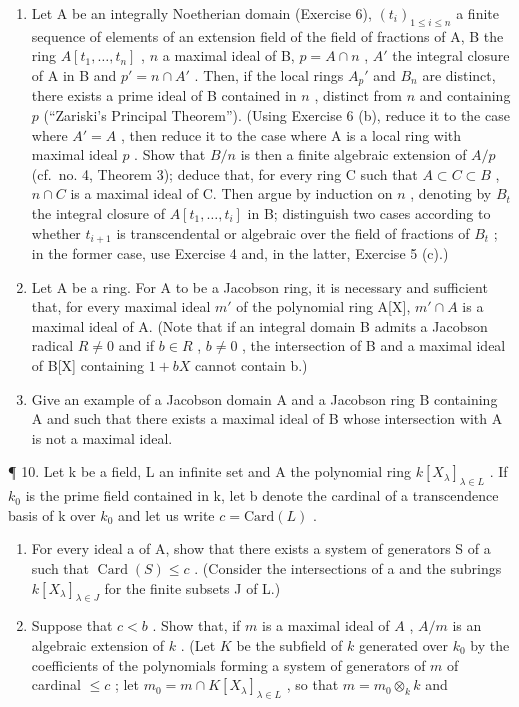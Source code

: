 \begin{enumerate}
\def\labelenumi{\arabic{enumi}.}
\setcounter{enumi}{6}
\item
  Let A be an integrally Noetherian domain (Exercise 6), \((t_i)_{1 \leq i \leq n}\) a finite sequence of elements of an extension field of the field of fractions of A, B the ring \(A[t_1, \ldots, t_n]\) , \(n\) a maximal ideal of B, \(p = A \cap n\) , \(A'\) the integral closure of A in B and \(p' = n \cap A'\) . Then, if the local rings \(A_p'\) and \(B_n\) are distinct, there exists a prime ideal of B contained in \(n\) , distinct from \(n\) and containing \(p\) (``Zariski's Principal Theorem''). (Using Exercise 6 (b), reduce it to the case where \(A' = A\) , then reduce it to the case where A is a local ring with maximal ideal \(p\) . Show that \(B/n\) is then a finite algebraic extension of \(A/p\) (cf.~no. 4, Theorem 3); deduce that, for every ring C such that \(A \subset C \subset B\) , \(n \cap C\) is a maximal ideal of C. Then argue by induction on \(n\) , denoting by \(B_t\) the integral closure of \(A[t_1, \ldots, t_i]\) in B; distinguish two cases according to whether \(t_{i+1}\) is transcendental or algebraic over the field of fractions of \(B_t\) ; in the former case, use Exercise 4 and, in the latter, Exercise 5 (c).)
\item
  Let A be a ring. For A to be a Jacobson ring, it is necessary and sufficient that, for every maximal ideal \(m'\) of the polynomial ring A{[}X{]}, \(m' \cap A\) is a maximal ideal of A. (Note that if an integral domain B admits a Jacobson radical \(R \neq 0\) and if \(b \in R\) , \(b \neq 0\) , the intersection of B and a maximal ideal of B{[}X{]} containing \(1 + bX\) cannot contain b.)
\item
  Give an example of a Jacobson domain A and a Jacobson ring B containing A and such that there exists a maximal ideal of B whose intersection with A is not a maximal ideal.
\end{enumerate}

¶ 10. Let k be a field, L an infinite set and A the polynomial ring \(k[X_{\lambda}]_{\lambda \in L}\) . If \(k_{0}\) is the prime field contained in k, let b denote the cardinal of a transcendence basis of k over \(k_{0}\) and let us write \(c = \text{Card}(L)\) .

\begin{enumerate}
\def\labelenumi{(\alph{enumi})}
\item
  For every ideal a of A, show that there exists a system of generators S of a such that \(\operatorname{Card}(S) \leqslant c\) . (Consider the intersections of a and the subrings \(k[X_{\lambda}]_{\lambda \in J}\) for the finite subsets J of L.)
\item
  Suppose that \(c < b\) . Show that, if \(m\) is a maximal ideal of \(A\) , \(A / m\) is an algebraic extension of \(k\) . (Let \(K\) be the subfield of \(k\) generated over \(k_0\) by the coefficients of the polynomials forming a system of generators of \(m\) of cardinal \(\leqslant c\) ; let \(m_0 = m \cap K[X_\lambda]_{\lambda \in L}\) , so that \(m = m_0 \otimes_k k\) and
\end{enumerate}

